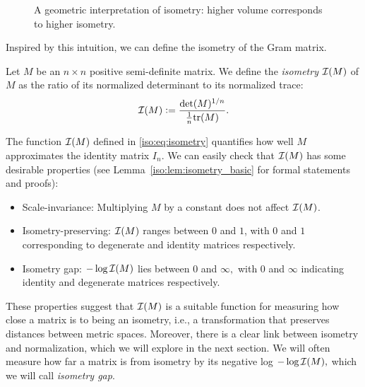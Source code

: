 \begin{figure}[ht]
    \centering
    
    \caption{A geometric interpretation of isometry: higher volume corresponds to higher isometry.}
    \label{iso:fig:isometry}
\end{figure}

Inspired by this intuition, we can define the isometry of the Gram matrix. 

\begin{definition}
Let $M$ be an $n \times n$ positive semi-definite matrix. We define the \emph{isometry $\mathcal{I}(M)$} of $M$ as the ratio of its normalized determinant to its normalized trace:
\begin{align}\label{iso:eq:isometry}
\mathcal{I}(M) := \frac{\text{det}(M)^{1/n}}{\frac1n\mathrm{tr}(M)}.
\end{align}
\end{definition}
The function $\mathcal{I}(M)$ defined in \eqref{iso:eq:isometry} quantifies how well $M$ approximates the identity matrix $I_n$. We can easily check that $\mathcal{I}(M)$ has some desirable properties (see Lemma~\ref{iso:lem:isometry_basic} for formal statements and proofs):
\begin{itemize}
    \item Scale-invariance: Multiplying $M$ by a constant does not affect $\mathcal{I}(M)$.%
    \item Isometry-preserving: $\mathcal{I}(M)$ ranges between $0$ and $1$, with $0$ and $1$ corresponding to degenerate and identity matrices respectively.
    \item Isometry gap: $-\log\mathcal{I}(M)$ lies between $0$ and $\infty,$ with $0$ and $\infty$ indicating identity and degenerate matrices respectively.
\end{itemize}
These properties suggest that $\mathcal{I}(M)$ is a suitable function for measuring how close a matrix is to being an isometry, i.e., a transformation that preserves distances between metric spaces. Moreover, there is a clear link between isometry and normalization, which we will explore in the next section. We will often measure how far a matrix is from isometry by its negative log $-\log\mathcal{I}(M),$ which we will call \emph{isometry gap}.

